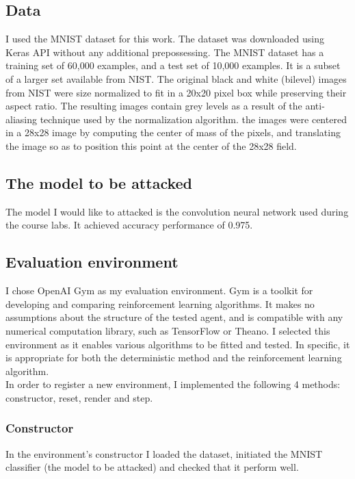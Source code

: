 \documentclass{article}
\begin{document}
\subsection{Data}
I used the MNIST \cite{mnist10027939599} dataset for this work. The dataset was downloaded using Keras API without any additional prepossessing. 
The MNIST dataset has a training set of 60,000 examples, and a test set of 10,000 examples. It is a subset of a larger set available from NIST. The original black and white (bilevel) images from NIST were size normalized to fit in a 20x20 pixel box while preserving their aspect ratio. The resulting images contain grey levels as a result of the anti-aliasing technique used by the normalization algorithm. the images were centered in a 28x28 image by computing the center of mass of the pixels, and translating the image so as to position this point at the center of the 28x28 field. \\

\subsection{The model to be attacked}
The model I would like to attacked is the convolution neural network used during the course labs. It achieved accuracy performance of 0.975.

\subsection{Evaluation environment}
I chose OpenAI Gym \cite{brockman2016openai} as my evaluation environment. Gym is a toolkit for developing and comparing reinforcement learning algorithms. It makes no assumptions about the structure of the tested agent, and is compatible with any numerical computation library, such as TensorFlow or Theano.
I selected this environment as it enables various algorithms to be fitted and tested. In specific, it is appropriate for both the deterministic method and the reinforcement learning algorithm. \\
In order to register a new environment, I implemented the following 4 methods: constructor, reset, render and step.
\subsubsection{Constructor}
In the environment's constructor I loaded the dataset, initiated the MNIST classifier (the model to be attacked) and checked that it perform well.
\end{document}
